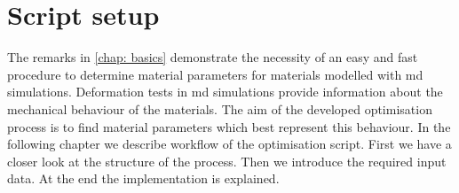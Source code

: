 




\chapter{Script setup} \label{chap:modelsAndMethods}

The remarks in \autoref{chap: basics} demonstrate the necessity of an easy and fast procedure to determine material parameters for materials modelled with \acrshort{md} simulations. Deformation tests in \acrshort{md} simulations provide information about the mechanical behaviour of the materials. The aim of the developed optimisation process is to find material parameters which best represent this behaviour.
In the following chapter we describe workflow of the optimisation script. First we have a closer look at the structure of the process. Then we introduce the required input data. At the end the implementation is explained. \\

